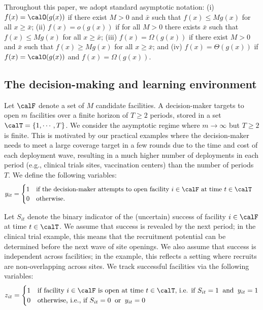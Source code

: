 \documentclass[blindrev]{informs3noheader}
\begin{document}
Throughout this paper, we adopt standard asymptotic notation: (i) $f(x)=\calO(g(x))$ if there exist $M>0$ and $\bar{x}$ such that $f(x)\leq Mg(x)$ for all $x\geq\bar{x}$; (ii) $f(x)=o(g(x))$ if for all $M>0$ there exists $\bar{x}$ such that $f(x)\leq Mg(x)$ for all $x\geq\bar{x}$; (iii) $f(x)=\Omega(g(x))$ if there exist $M>0$ and $\bar{x}$ such that $f(x)\geq Mg(x)$ for all $x\geq\bar{x}$; and (iv) $f(x)=\Theta(g(x))$ if $f(x)=\calO(g(x))$ and $f(x)=\Omega(g(x))$.

\subsection{The decision-making and learning environment}
\label{subsec:DMenvironment}

Let $\calF$ denote a set of $M$ candidate facilities. A decision-maker targets to open $m$ facilities over a finite horizon of $T\geq 2$ periods, stored in a set $\calT=\{1,\cdots,T\}$. We consider the asymptotic regime where $m\to\infty$ but $T\geq2$ is finite. This is motivated by our practical examples where the decision-maker needs to meet a large coverage target in a few rounds due to the time and cost of each deployment wave, resulting in a much higher number of deployments in each period (e.g., clinical trials sites, vaccination centers) than the number of periods $T$. We define the following variables:
\begin{align*}
    y_{it}&=\begin{cases}
        1&\text{if the decision-maker attempts to open facility $i\in\calF$ at time $t\in\calT$}\\
        0&\text{otherwise.}
    \end{cases}
\end{align*}

Let $S_{it}$ denote the binary indicator of the (uncertain) success of facility $i\in\calF$ at time $t\in\calT$. We assume that success is revealed by the next period; in the clinical trial example, this means that the recruitment potential can be determined before the next wave of site openings. We also assume that success is independent across facilities; in the example, this reflects a setting where recruits are non-overlapping across sites. We track successful facilities via the following variables:
\begin{equation}\label{eq:z}
    z_{it} = \begin{cases}
        1 & \text{if facility $i\in\calF$ is open at time $t\in\calT$, i.e. if}\ S_{it} = 1 \;\; \text{and}\;\; y_{it}=1\\ 
        0 & \text{otherwise, i.e., if}\ S_{it} = 0 \;\; \text{or}\;\; y_{it}=0
    \end{cases}
\end{equation}
\end{document}
